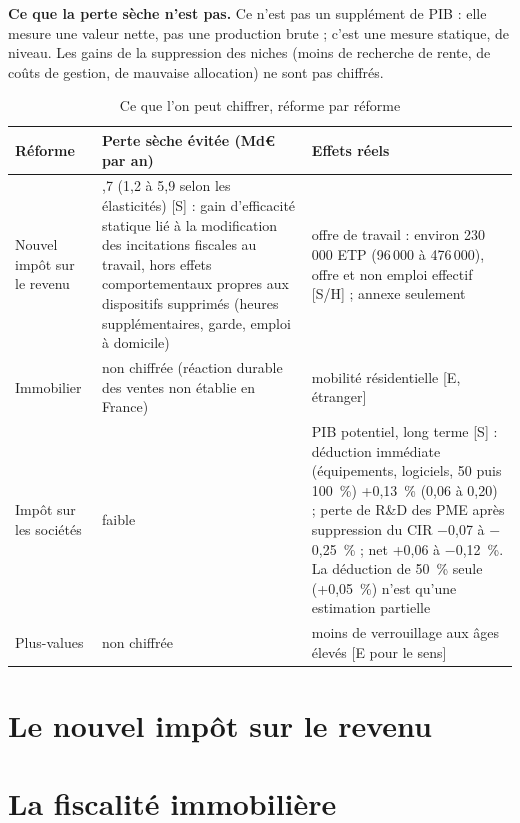 \documentclass[10pt,a4paper]{article}
\begin{document}
\textbf{Ce que la perte sèche n'est pas.} Ce n'est pas un supplément de PIB : elle mesure une valeur nette, pas une
production brute ; c'est une mesure statique, de niveau. Les gains de la suppression des niches (moins de recherche de
rente, de coûts de gestion, de mauvaise allocation) ne sont pas chiffrés.

\begin{table}[!htbp]\centering\small\setlength{\tabcolsep}{4pt}
\caption{Ce que l'on peut chiffrer, réforme par réforme}
\begin{tabularx}{\linewidth}{@{}>{\raggedright\arraybackslash}p{2.6cm}>{\raggedright\arraybackslash}X>{\raggedright\arraybackslash}p{4.6cm}@{}}
\toprule
Réforme & Perte sèche évitée (Md€ par an) & Effets réels \\
\midrule
Nouvel impôt sur le revenu & 2,7 (1,2 à 5,9 selon les élasticités) [S] : gain d'efficacité statique lié à la modification des incitations fiscales au travail, hors effets comportementaux propres aux dispositifs supprimés (heures supplémentaires, garde, emploi à domicile) & offre de travail : environ 230\,000 ETP
(96\,000 à 476\,000), offre et non emploi effectif [S/H] ; annexe seulement \\
Immobilier & non chiffrée (réaction durable des ventes non établie en France) & mobilité résidentielle [E, étranger] \\
Impôt sur les sociétés & faible & PIB potentiel, long terme [S] : déduction immédiate (équipements, logiciels, 50 puis 100~\%) +0,13~\% (0,06 à 0,20) ; perte de R\&D des PME après suppression du CIR $-$0,07 à $-$0,25~\% ; net +0,06 à $-$0,12~\%. La déduction de 50~\% seule (+0,05~\%) n'est qu'une estimation partielle \\
Plus-values & non chiffrée & moins de verrouillage aux âges élevés [E pour le sens] \\
\bottomrule
\end{tabularx}
\end{table}

\section{Le nouvel impôt sur le revenu}\label{ann:ircsg}


\section{La fiscalité immobilière}\label{ann:foncier}

\end{document}
